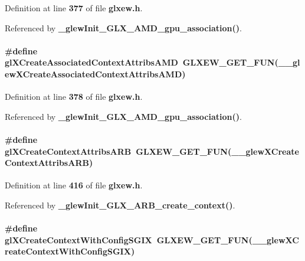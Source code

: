 Definition at line {\bf 377} of file {\bf glxew.\+h}.



Referenced by {\bf \+\_\+glew\+Init\+\_\+\+G\+L\+X\+\_\+\+A\+M\+D\+\_\+gpu\+\_\+association()}.

\paragraph[{gl\+X\+Create\+Associated\+Context\+Attribs\+A\+MD}]{\setlength{\rightskip}{0pt plus 5cm}\#define gl\+X\+Create\+Associated\+Context\+Attribs\+A\+MD~{\bf G\+L\+X\+E\+W\+\_\+\+G\+E\+T\+\_\+\+F\+UN}({\bf \+\_\+\+\_\+glew\+X\+Create\+Associated\+Context\+Attribs\+A\+MD})}\label{glxew_8h_ac634631c1fa47a2440ff4c8243001d2b}


Definition at line {\bf 378} of file {\bf glxew.\+h}.



Referenced by {\bf \+\_\+glew\+Init\+\_\+\+G\+L\+X\+\_\+\+A\+M\+D\+\_\+gpu\+\_\+association()}.

\paragraph[{gl\+X\+Create\+Context\+Attribs\+A\+RB}]{\setlength{\rightskip}{0pt plus 5cm}\#define gl\+X\+Create\+Context\+Attribs\+A\+RB~{\bf G\+L\+X\+E\+W\+\_\+\+G\+E\+T\+\_\+\+F\+UN}({\bf \+\_\+\+\_\+glew\+X\+Create\+Context\+Attribs\+A\+RB})}\label{glxew_8h_a2fe2e4d2ac7f98074003289fa52e93a1}


Definition at line {\bf 416} of file {\bf glxew.\+h}.



Referenced by {\bf \+\_\+glew\+Init\+\_\+\+G\+L\+X\+\_\+\+A\+R\+B\+\_\+create\+\_\+context()}.

\paragraph[{gl\+X\+Create\+Context\+With\+Config\+S\+G\+IX}]{\setlength{\rightskip}{0pt plus 5cm}\#define gl\+X\+Create\+Context\+With\+Config\+S\+G\+IX~{\bf G\+L\+X\+E\+W\+\_\+\+G\+E\+T\+\_\+\+F\+UN}({\bf \+\_\+\+\_\+glew\+X\+Create\+Context\+With\+Config\+S\+G\+IX})}\label{glxew_8h_a06f740f0e7218ccb28c9db0d5952a636}


